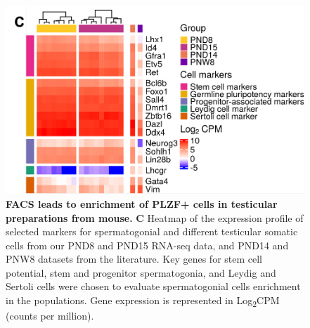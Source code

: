 \documentclass[12pt,twoside]{reedthesis}
\begin{document}
\begin{subfigures}
\begin{figure}[htbp]

{\centering \includegraphics{thesis_files/figure-latex/ds1b-1} 

}

\caption[FACS leads to enrichment of PLZF+ cells in testicular preparations from mouse]{\textbf{FACS leads to enrichment of PLZF+ cells in testicular preparations from mouse.} \newline \textbf{C} Heatmap of the expression profile of selected markers for spermatogonial and different testicular somatic cells from our PND8 and PND15  RNA-seq data, and PND14 and PNW8 datasets from the literature. Key genes for stem cell potential, stem and progenitor spermatogonia, and Leydig and Sertoli cells were chosen to evaluate spermatogonial cells enrichment in the populations. Gene expression is represented in Log\textsubscript{2}CPM (counts per million).}\label{fig:ds1b}
\end{figure}
\end{subfigures}
\end{document}
